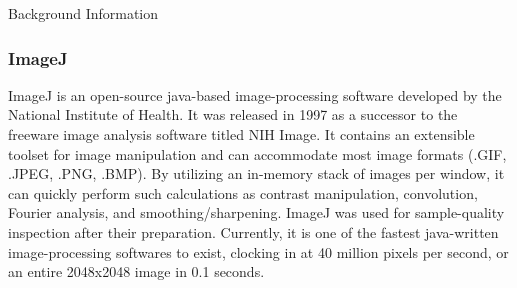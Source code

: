 \documentclass[a4paper,12pt]{article}
\begin{document}
\begin{section}{Background Information}
\subsubsection{ImageJ}

ImageJ is an open-source java-based image-processing software developed by the National Institute of Health. It was released in 1997 as a successor to the freeware image analysis software titled NIH Image. It contains an extensible toolset for image manipulation and can accommodate most image formats (.GIF, .JPEG, .PNG, .BMP). By utilizing an in-memory stack of images per window, it can quickly perform such calculations as contrast manipulation, convolution, Fourier analysis, and smoothing/sharpening. ImageJ was used for sample-quality inspection after their preparation. Currently, it is one of the fastest java-written image-processing softwares to exist, clocking in at 40 million pixels per second, or an entire 2048x2048 image in 0.1 seconds.

\end{section}
\end{document}

